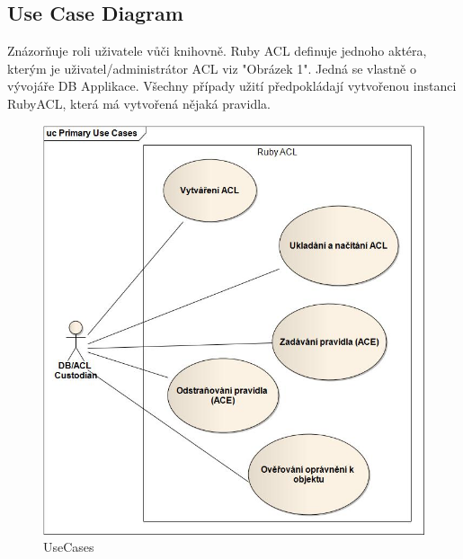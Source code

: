 \documentclass[11pt,twoside,a4paper]{book}
\begin{document}
\subsection{Use Case Diagram}
Znázorňuje roli uživatele vůči knihovně. Ruby ACL definuje jednoho aktéra, kterým je uživatel/administrátor ACL viz "Obrázek 1". Jedná se vlastně o vývojáře DB Applikace.
Všechny případy užití předpokládají vytvořenou instanci RubyACL, která má vytvořená nějaká pravidla.
\begin{figure}
\includegraphics[width=15cm]{UseCases.jpg}
\caption{UseCases}
\label{fig:UseCases}
\end{figure}

\end{document}
